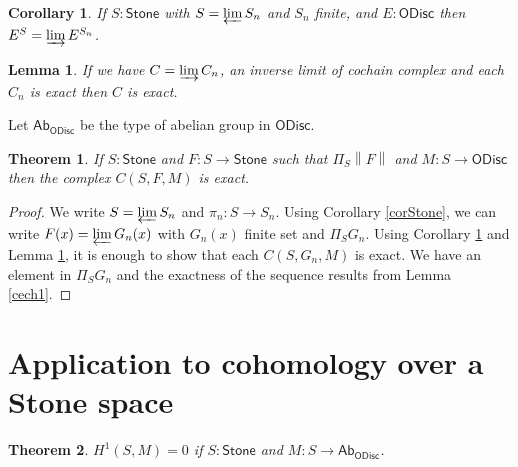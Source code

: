 \documentclass[10pt,a4paper]{article}
\newtheorem{theorem}{Theorem}[section]
\newtheorem{corollary}{Corollary}[section]
\newtheorem{lemma}{Lemma}[section]
\newcommand{\ODisc}{\mathsf{ODisc}}
\newcommand{\Stone}{\mathsf{Stone}}
\newcommand{\OAbG}{\mathsf{Ab_{ODisc}}}
\newcommand{\ra}{\rightarrow}
\newcommand\norm[1]{\left\lVert #1 \right\rVert}
\begin{document}
\begin{corollary}\label{cor1}
  If $S:\Stone$ with $S = \varprojlim S_n$ and $S_n$ finite, and $E:\ODisc$
  then  $E^S = \varinjlim E^{S_n}$.
\end{corollary}

\begin{lemma}\label{exlim}
  If we have $C = \varinjlim C_n$, an inverse limit of cochain complex
  and each $C_n$ is exact then $C$ is exact.
\end{lemma}

Let $\OAbG$ be the type of abelian group in $\ODisc$.

\begin{theorem}\label{main}
If $S:\Stone$ and $F:S\ra\Stone$ such that $\Pi_S\norm{F}$
and $M:S\ra\ODisc$ then the complex $C(S,F,M)$ is exact.
\end{theorem}

\begin{proof}
 We write $S = \varprojlim S_n$ and $\pi_n:S \ra S_n$.  
 Using Corollary \ref{corStone}, we can write $F(x) = \varprojlim G_n(x)$ with $G_n(x)$ finite
 set and $\Pi_SG_n$. Using Corollary \ref{cor1} and Lemma \ref{exlim}, it is enough
 to show that each $C(S,G_n,M)$ is exact.
 We have an element in $\Pi_SG_n$ and the exactness of the sequence results from Lemma \ref{cech1}.
\end{proof}

\section{Application to cohomology over a Stone space}

\begin{theorem}\label{cohom1}
  $H^1(S,M) = 0$ if $S:\Stone$ and $M:S\ra\OAbG$.
\end{theorem}
\end{document}
